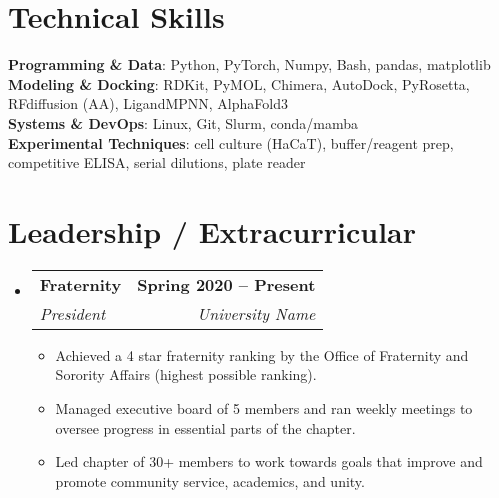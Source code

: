 \documentclass[letterpaper,11pt]{article}
\makeatletter
\newcommand{\resumeItem}[1]{
  \item\small{
    {#1 \vspace{-2pt}}
  }
}
\newcommand{\resumeSubheading}[4]{
  \vspace{-2pt}\item
    \begin{tabular*}{1.0\textwidth}[t]{l@{\extracolsep{\fill}}r}
      \textbf{#1} & \textbf{\small #2} \\
      \textit{\small#3} & \textit{\small #4} \\
    \end{tabular*}\vspace{-7pt}
}
\newcommand{\resumeSubHeadingListStart}{\begin{itemize}[leftmargin=0.0in, label={}]}
\newcommand{\resumeSubHeadingListEnd}{\end{itemize}}
\newcommand{\resumeItemListStart}{\begin{itemize}}
\newcommand{\resumeItemListEnd}{\end{itemize}\vspace{-5pt}}
\makeatother
\begin{document}
%
\section{Technical Skills}
 \begin{itemize}[leftmargin=0.15in, label={}]
    \small{\item{
    \textbf{Programming \& Data}: Python, PyTorch, Numpy, Bash, pandas, matplotlib \\
    \textbf{Modeling \& Docking}: RDKit, PyMOL, Chimera, AutoDock, PyRosetta, RFdiffusion (AA), LigandMPNN, AlphaFold3 \\
    \textbf{Systems \& DevOps}: Linux, Git, Slurm, conda/mamba \\
    \textbf{Experimental Techniques}: cell culture (HaCaT), buffer/reagent prep, competitive ELISA, serial dilutions, plate reader

    }}
 \end{itemize}
 \vspace{-16pt}


\section{Leadership / Extracurricular}
    \resumeSubHeadingListStart
        \resumeSubheading{Fraternity}{Spring 2020 -- Present}{President}{University Name}
            \resumeItemListStart
                \resumeItem{Achieved a 4 star fraternity ranking by the Office of Fraternity and Sorority Affairs (highest possible ranking).}
                \resumeItem{Managed executive board of 5 members and ran weekly meetings to oversee progress in essential parts of the chapter.}
                \resumeItem{Led chapter of 30+ members to work towards goals that improve and promote community service, academics, and unity.}
            \resumeItemListEnd
        
    \resumeSubHeadingListEnd
\end{document}
